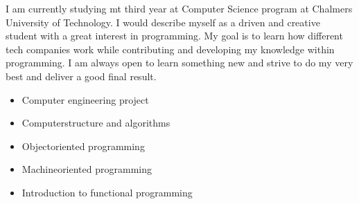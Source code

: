 I am currently studying mt third year at Computer Science program at Chalmers University of Technology. 
I would describe myself as a driven and creative student with a great interest 
in programming. My goal is to learn how different tech companies work while contributing
 and developing my knowledge within programming. I am always open to learn something new 
 and strive to do my very best and deliver a good final result.


\begin{itemize}
    \item Computer engineering project
    \item Computerstructure and algorithms
    \item Objectoriented programming
    \item Machineoriented programming
    \item Introduction to functional programming
\end{itemize}







